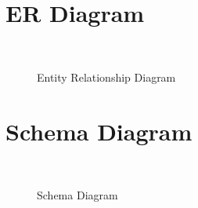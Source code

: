 \section{ER Diagram}
\begin{figure}[H]
    \centering
    \qquad
    \caption{Entity Relationship Diagram}%
    \\[0.2in]
    \label{fig: Entity Relationship Diagram}
    \centering
\end{figure}

\thispagestyle{fancy}

\section{Schema Diagram}
\begin{figure}[H]
    \centering
    \qquad
    \caption{Schema Diagram}%
    \\[0.2in]
    \label{fig: Schema Diagram}
    \centering
\end{figure}

